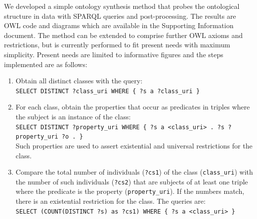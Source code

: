 \documentclass[review]{elsarticle}
\newcommand{\textttt}[1] {\texttt{\footnotesize#1}}
\newcommand{\h} {\hphantom ~ }
\begin{document}
We developed a simple ontology synthesis method that probes
the ontological structure in data with
SPARQL queries and post-processing.
The results are OWL code and diagrams which are available in the
Supporting Information document.
The method can be extended to comprise further OWL axioms and restrictions,
but is currently performed to fit present needs with maximum simplicity.
Present needs are limited to informative figures and
the steps implemented are as follows:
\begin{enumerate}[leftmargin=0cm]
    \item Obtain all distinct classes with the query:\\
        \textttt{SELECT DISTINCT ?class\_uri WHERE \{ ?s a ?class\_uri \}}
\item For each class, obtain the properties that occur as predicates in triples where the subject is an instance of the class:\\
	\textttt{SELECT DISTINCT ?property\_uri WHERE \{ ?s a <class\_uri> . ?s ?property\_uri ?o . \}}\\
Such properties are used to assert existential and universal restrictions for the class.
\item Compare the total number of individuals (\textttt{?cs1}) of the class (\textttt{class\_uri}) with
	the number of such individuals (\textttt{?cs2}) that are subjects of at least one triple where 
	the predicate is the property (\textttt{property\_uri}).
	If the numbers match, there is an existential restriction for the class. The queries are:\\
	\textttt{SELECT (COUNT(DISTINCT ?s) as ?cs1) WHERE \{ ?s a <class\_uri> \}}\\

\end{enumerate}
\end{document}
